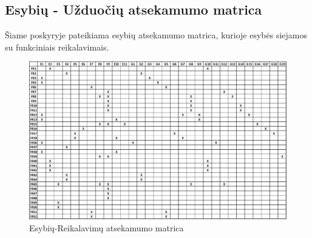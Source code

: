 \documentclass{VUMIFPSbakalaurinis}
\begin{document}
\subsection{Esybių - Užduočių atsekamumo matrica}
Šiame poskyryje pateikiama esybių atsekamumo matrica, kurioje esybės siejamos su funkciniais reikalavimais.
\begin{figure}[H]
    \centering
    \includegraphics[scale=0.5]{img/Entity-matrix}
    \caption{Esybių-Reikalavimų atsekamumo matrica}
    \label{img:entity-matrix}
\end{figure}
\end{document}
